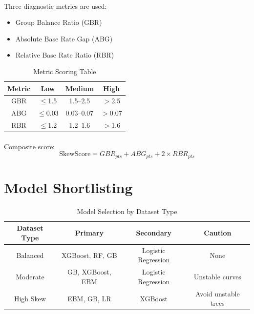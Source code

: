 \paragraph{}
Three diagnostic metrics are used:

\begin{itemize}
    \item Group Balance Ratio (GBR)
    \item Absolute Base Rate Gap (ABG)
    \item Relative Base Rate Ratio (RBR)
\end{itemize}

\begin{table}[h]
\centering
\caption{Metric Scoring Table}
\renewcommand{\arraystretch}{1.3}
\begin{tabular}{|c|c|c|c|}
\hline
Metric & Low & Medium & High \\ \hline
GBR & $\leq$1.5 & 1.5--2.5 & $>$2.5 \\ \hline
ABG & $\leq$0.03 & 0.03--0.07 & $>$0.07 \\ \hline
RBR & $\leq$1.2 & 1.2--1.6 & $>$1.6 \\ \hline
\end{tabular}
\end{table}

\paragraph{}
Composite score:
\[
\text{SkewScore} = GBR_{pts} + ABG_{pts} + 2 \times RBR_{pts}
\]

\section{Model Shortlisting}
\paragraph{}
\begin{table}[h]
\centering
\caption{Model Selection by Dataset Type}
\renewcommand{\arraystretch}{1.3}
\begin{tabular}{|c|c|c|c|}
\hline
Dataset Type & Primary & Secondary & Caution \\ \hline
Balanced & XGBoost, RF, GB & Logistic Regression & None \\ \hline
Moderate & GB, XGBoost, EBM & Logistic Regression & Unstable curves \\ \hline
High Skew & EBM, GB, LR & XGBoost & Avoid unstable trees \\ \hline
\end{tabular}
\end{table}

